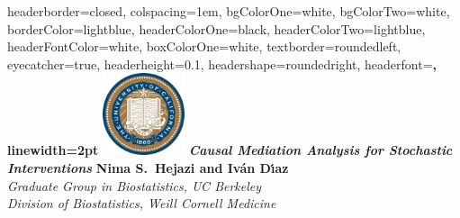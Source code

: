 \documentclass[landscape,a0paper,fontscale=0.285]{baposter} %
\begin{document}
\begin{poster} {
headerborder=closed, %
colspacing=1em, %
bgColorOne=white, %
bgColorTwo=white, %
borderColor=lightblue, %
headerColorOne=black, %
headerColorTwo=lightblue, %
headerFontColor=white, %
boxColorOne=white, %
textborder=roundedleft, %
eyecatcher=true, %
headerheight=0.1\textheight, %
headershape=roundedright, %
headerfont=\Large\bf\textsc, %
linewidth=2pt %
}
%
{\includegraphics[height=6.5em]{logo_berkeley.jpg}} %
{\bf\textit{\LARGE Causal Mediation Analysis for Stochastic
    Interventions}\vspace{0.01em}} %
{\textbf{Nima S.~Hejazi and Iv{\'a}n D{\'\i}az} \\
  \textit{Graduate Group in Biostatistics, UC Berkeley} \\
  \textit{Division of Biostatistics, Weill Cornell Medicine}}



\end{poster}
\end{document}
